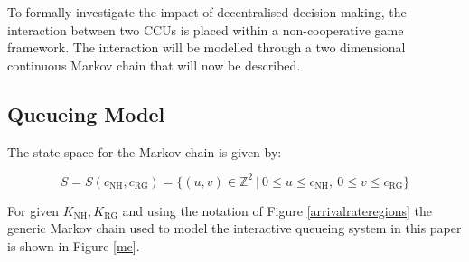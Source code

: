 \documentclass{article}
\newcommand{\NH}{\text{NH}}
\newcommand{\RG}{\text{RG}}
\begin{document}
To formally investigate the impact of decentralised decision making, the interaction between two CCUs is placed within a non-cooperative game framework.
The interaction will be modelled through a two dimensional continuous Markov chain that will now be described.

\subsection{Queueing Model}

The state space for the Markov chain is given by:

\begin{equation}
S=S(c_{\NH}, c_{\RG})= \{(u,v)\in \mathbb{Z}^2\ |\ 0\leq u\leq c_{\NH},\ 0\leq v\leq c_{\RG}\} \label{statespace}
\end{equation}

For given $K_{\NH}, K_{\RG}$ and using the notation of Figure \ref{arrivalrateregions} the generic Markov chain used to model the interactive queueing system in this paper is shown in Figure \ref{mc}.
\end{document}
